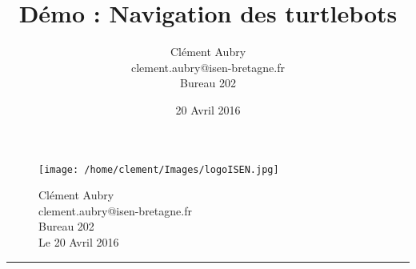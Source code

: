 \documentclass[11pt, a4paper,notitlepage]{article}
\newcommand{\ladate}{20 Avril 2016}
\begin{document}

\title{Démo : Navigation des turtlebots}
\author{Cl\'{e}ment Aubry\\
clement.aubry@isen-bretagne.fr\\Bureau 202}
\date{\ladate}

\begin{figure}[!ht]
  \begin{minipage}{6cm}
    \texttt{[image: /home/clement/Images/logoISEN.jpg]}
  \end{minipage}%
  \hspace{2cm}
\begin{minipage}{6cm}\begin{center}\textcolor{grayisen1}{
  Clément Aubry\\
clement.aubry@isen-bretagne.fr\\Bureau 202\\
  Le \ladate}
\end{center}\end{minipage}
\end{figure}
\noindent\textcolor{redisen}{\rule{\linewidth}{1pt}}
\end{document}
